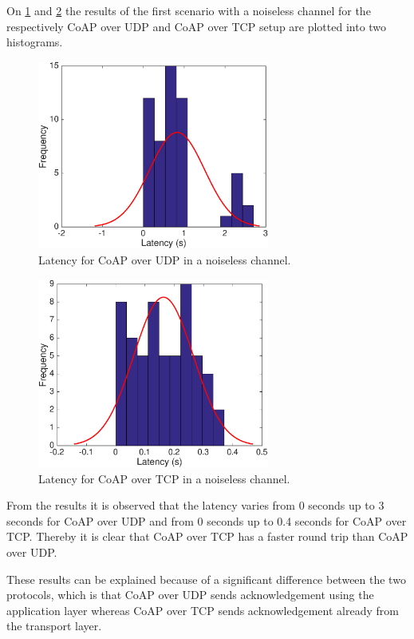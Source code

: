 On \figurename{\ref{fig:coapconlatency}} and \figurename{\ref{fig:coaptcplatency}} the results of the first scenario with a noiseless channel for the respectively CoAP over UDP and CoAP over TCP setup are plotted into two histograms. 
\begin{figure}[bht]
	\centering
	\includegraphics[width=3in]{gfx/coapoverudp}
	\caption{Latency for CoAP over UDP in a noiseless channel.}
	\label{fig:coapconlatency}
\end{figure}
\begin{figure}[bht]
	\centering
	\includegraphics[width=3in]{gfx/coapovertcp}
	\caption{Latency for CoAP over TCP in a noiseless channel.}
	\label{fig:coaptcplatency}
\end{figure}

From the results it is observed  that the latency varies from 0 seconds up to 3 seconds for CoAP over UDP and from 0 seconds up to 0.4 seconds for CoAP over TCP. Thereby it is clear that CoAP over TCP has a faster round trip than CoAP over UDP. 

These results can be explained because of a significant difference between the two protocols, which is that CoAP over UDP sends acknowledgement using the application layer whereas CoAP over TCP sends acknowledgement already from the transport layer. 

